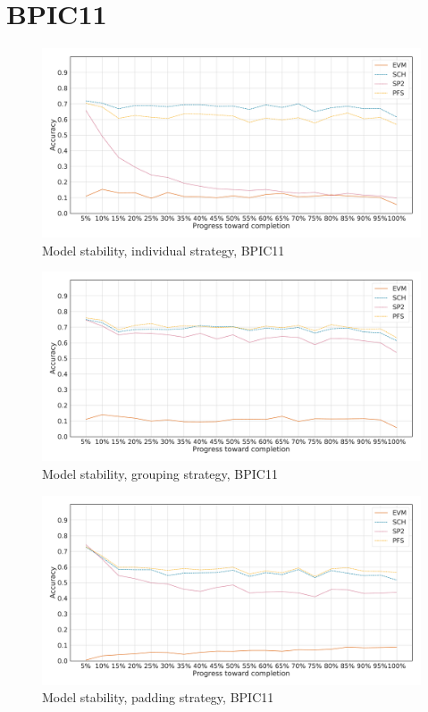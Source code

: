 \FloatBarrier


\section*{BPIC11}\label{appendix:stability:bpic2011}
\begin{figure}[!htb]
    \centering
    \includegraphics[width=\textwidth]{gfx/bpic2011/individual_stability.pdf}
    \caption{Model stability, individual strategy, BPIC11}
    \label{fig:bpic11-individual-stability}
\end{figure}
\begin{figure}[!htb]
    \centering
    \includegraphics[width=\textwidth]{gfx/bpic2011/grouped_stability.pdf}
    \caption{Model stability, grouping strategy, BPIC11}
    \label{fig:bpic11-grouped-stability}
\end{figure}
\begin{figure}[!htb]
    \centering
    \includegraphics[width=\textwidth]{gfx/bpic2011/padded_stability.pdf}
    \caption{Model stability, padding strategy, BPIC11}
    \label{fig:bpic11-padded-stability}
\end{figure}
